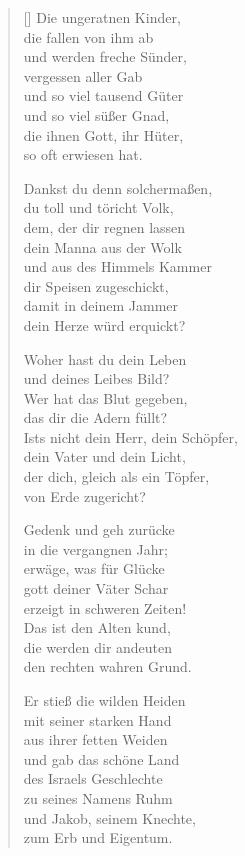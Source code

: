 \begin{multicols}{2}
\begin{verse}[\versewidth]
 Die ungeratnen Kinder,\\
die fallen von ihm ab\\
und werden freche Sünder,\\
vergessen aller Gab\\
und so viel tausend Güter\\
und so viel süßer Gnad,\\
die ihnen Gott, ihr Hüter,\\
so oft erwiesen hat.

 Dankst du denn solchermaßen,\\
du toll und töricht Volk,\\
dem, der dir regnen lassen\\
dein Manna aus der Wolk\\
und aus des Himmels Kammer\\
dir Speisen zugeschickt,\\
damit in deinem Jammer\\
dein Herze würd erquickt?

 Woher hast du dein Leben\\
und deines Leibes Bild?\\
Wer hat das Blut gegeben,\\
das dir die Adern füllt?\\
Ists nicht dein Herr, dein Schöpfer,\\
dein Vater und dein Licht,\\
der dich, gleich als ein Töpfer,\\
von Erde zugericht?

 Gedenk und geh zurücke\\
in die vergangnen Jahr;\\
erwäge, was für Glücke\\
gott deiner Väter Schar\\
erzeigt in schweren Zeiten!\\
Das ist den Alten kund,\\
die werden dir andeuten\\
den rechten wahren Grund.

 Er stieß die wilden Heiden\\
mit seiner starken Hand\\
aus ihrer fetten Weiden\\
und gab das schöne Land\\
des Israels Geschlechte\\
zu seines Namens Ruhm\\
und Jakob, seinem Knechte,\\
zum Erb und Eigentum.


\end{verse}
\end{multicols}
